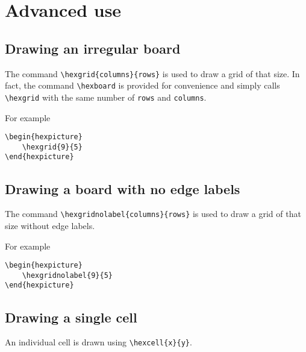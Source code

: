 \documentclass[a4paper,12pt]{article}
\begin{document}
    
    \section{Advanced use}
    
    \subsection{Drawing an irregular board}
    
    The command \verb|\hexgrid{columns}{rows}| is used to draw a grid of that size. In fact, the command \verb|\hexboard| is provided for convenience and simply calls \verb|\hexgrid| with the same number of \verb|rows| and \verb|columns|.
    
    For example
    
    \begin{verbatim}\begin{hexpicture}
    \hexgrid{9}{5}
\end{hexpicture}\end{verbatim}
    
    \begin{hexpicture}
    \end{hexpicture}
    
    \subsection{Drawing a board with no edge labels}
    
    The command \verb|\hexgridnolabel{columns}{rows}| is used to draw a grid of that size without edge labels.
    
    For example
    
    \begin{verbatim}\begin{hexpicture}
    \hexgridnolabel{9}{5}
\end{hexpicture}\end{verbatim}
    
    \begin{hexpicture}
    \end{hexpicture}
    
    
    \subsection{Drawing a single cell}
    
    An individual cell is drawn using \verb|\hexcell{x}{y}|. 
    
\end{document}

